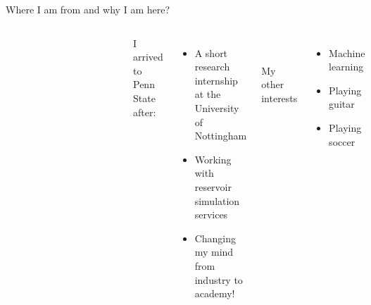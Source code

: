\documentclass[8pt]{beamer}
\begin{document}
\begin{frame}{Where I am from and why I am here?}
\begin{columns}[T]
\begin{figure}[h]
\begin{subfigure}{0.5\textwidth}
				\end{subfigure}%
				\begin{subfigure}{.5\textwidth}
					\centering
					\includegraphics[width=1\linewidth]{colombia.png}
				\end{subfigure}
			\end{figure}
			
			
			
			I arrived to Penn State after:
			\begin{itemize}
				\item A short research internship at the University of Nottingham
				\item Working with reservoir simulation services
				\item Changing my mind from industry to academy!
			\end{itemize}
			
			~\\~\\My other interests
			\begin{itemize}
				\item Machine learning 
				\item Playing guitar
				\item Playing soccer
			\end{itemize}
			
			\begin{figure}[b]
				\includegraphics[width=0.7\textwidth]{medellin.jpg}
			\end{figure}
		\end{columns}
		

\end{frame}
\end{document}
